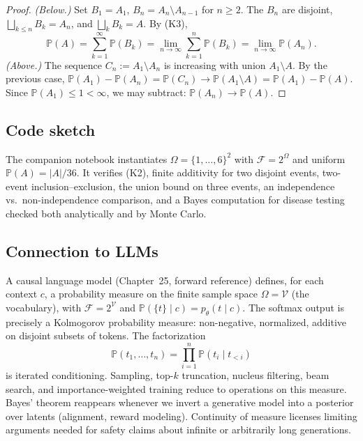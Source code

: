 \begin{proof}
\emph{(Below.)} Set $B_{1} = A_{1}$, $B_{n} = A_{n} \setminus A_{n-1}$ for $n \geq 2$. The $B_{n}$ are disjoint, $\bigsqcup_{k \leq n} B_{k} = A_{n}$, and $\bigsqcup_{k} B_{k} = A$. By (K3),
\[
  \mathbb{P}(A) = \sum_{k=1}^{\infty} \mathbb{P}(B_{k}) = \lim_{n \to \infty} \sum_{k=1}^{n} \mathbb{P}(B_{k}) = \lim_{n \to \infty} \mathbb{P}(A_{n}).
\]
\emph{(Above.)} The sequence $C_{n} := A_{1} \setminus A_{n}$ is increasing with union $A_{1} \setminus A$. By the previous case, $\mathbb{P}(A_{1}) - \mathbb{P}(A_{n}) = \mathbb{P}(C_{n}) \to \mathbb{P}(A_{1} \setminus A) = \mathbb{P}(A_{1}) - \mathbb{P}(A)$. Since $\mathbb{P}(A_{1}) \leq 1 < \infty$, we may subtract: $\mathbb{P}(A_{n}) \to \mathbb{P}(A)$.
\end{proof}

\subsection*{Code sketch}

The companion notebook instantiates $\Omega = \{1, \ldots, 6\}^{2}$ with $\mathcal{F} = 2^{\Omega}$ and uniform $\mathbb{P}(A) = |A| / 36$. It verifies (K2), finite additivity for two disjoint events, two-event inclusion--exclusion, the union bound on three events, an independence vs.\ non-independence comparison, and a Bayes computation for disease testing checked both analytically and by Monte Carlo.

\subsection*{Connection to LLMs}

A causal language model (Chapter~25, forward reference) defines, for each context $c$, a probability measure on the finite sample space $\Omega = \mathcal{V}$ (the vocabulary), with $\mathcal{F} = 2^{\mathcal{V}}$ and $\mathbb{P}(\{t\} \mid c) = p_{\theta}(t \mid c)$. The softmax output is precisely a Kolmogorov probability measure: non-negative, normalized, additive on disjoint subsets of tokens. The factorization
\[
  \mathbb{P}(t_{1}, \ldots, t_{n}) = \prod_{i=1}^{n} \mathbb{P}(t_{i} \mid t_{<i})
\]
is iterated conditioning. Sampling, top-$k$ truncation, nucleus filtering, beam search, and importance-weighted training reduce to operations on this measure. Bayes' theorem reappears whenever we invert a generative model into a posterior over latents (alignment, reward modeling). Continuity of measure licenses limiting arguments needed for safety claims about infinite or arbitrarily long generations.
